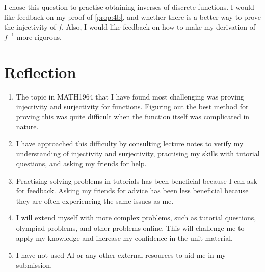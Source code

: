I chose this question to practise obtaining inverses of discrete functions.
I would like feedback on my proof of \cref{prop:4b}, and whether there is a better way to prove the injectivity of $f$.
Also, I would like feedback on how to make my derivation of $f^{-1}$ more rigorous.

\section*{Reflection}

\begin{enumerate}
    \item The topic in MATH1964 that I have found most challenging was proving injectivity and surjectivity for functions.
        Figuring out the best method for proving this was quite difficult when the function itself was complicated in nature.
    \item I have approached this difficulty by consulting lecture notes to verify my understanding of injectivity and surjectivity, practising my skills with tutorial questions, and asking my friends for help.
    \item Practising solving problems in tutorials has been beneficial because I can ask for feedback.
        Asking my friends for advice has been less beneficial because they are often experiencing the same issues as me.
    \item I will extend myself with more complex problems, such as tutorial questions, olympiad problems, and other problems online.
        This will challenge me to apply my knowledge and increase my confidence in the unit material.
    \item I have not used AI or any other external resources to aid me in my submission.
\end{enumerate}
